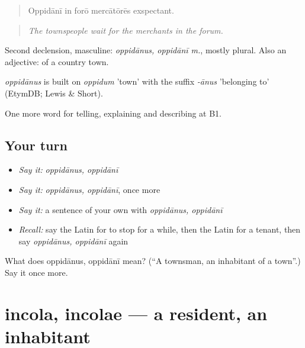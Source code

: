 \begin{quote}
Oppidānī in forō mercātōrēs exspectant.
\end{quote}

\begin{quote}
\emph{The townspeople wait for the merchants in the forum.}
\end{quote}

Second declension, masculine: \emph{oppidānus, oppidānī m.}, mostly plural. Also an adjective: of a country town.

\begin{cousinweb}
\emph{oppidānus} is built on \emph{oppidum} 'town' with the suffix \emph{-ānus} 'belonging to' (EtymDB; Lewis \& Short).
\end{cousinweb}

\begin{grammarlens}[title={What you've built}]
One more word for telling, explaining and describing at B1.
\end{grammarlens}

\subsection*{Your turn}
\begin{itemize}
\raggedright
  \item \emph{Say it:} \emph{oppidānus, oppidānī}
  \item \emph{Say it:} \emph{oppidānus, oppidānī}, once more
  \item \emph{Say it:} a sentence of your own with \emph{oppidānus, oppidānī}
  \item \emph{Recall:} say the Latin for to stop for a while, then the Latin for a tenant, then say \emph{oppidānus, oppidānī} again
\end{itemize}

\begin{tcolorbox}[breakable,colback=teal!4,colframe=teal!35!black,title={Before you move on}]
What does oppidānus, oppidānī mean? (\textquotedblleft{}A townsman, an inhabitant of a town\textquotedblright{}.) Say it once more.
\end{tcolorbox}
\section[incola, incolae]{incola, incolae — a resident, an inhabitant}

\label{lesson:LA-C456-incola}



